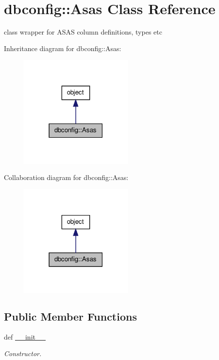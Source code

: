 \hypertarget{classdbconfig_1_1Asas}{
\section{dbconfig::Asas Class Reference}
\label{classdbconfig_1_1Asas}
}


class wrapper for ASAS column definitions, types etc  




Inheritance diagram for dbconfig::Asas:\nopagebreak
\begin{figure}[H]
\begin{center}
\leavevmode
\includegraphics[width=162pt]{classdbconfig_1_1Asas__inherit__graph}
\end{center}
\end{figure}


Collaboration diagram for dbconfig::Asas:\nopagebreak
\begin{figure}[H]
\begin{center}
\leavevmode
\includegraphics[width=162pt]{classdbconfig_1_1Asas__coll__graph}
\end{center}
\end{figure}
\subsection*{Public Member Functions}
\begin{DoxyCompactItemize}
\item 
def \hyperlink{classdbconfig_1_1Asas_a9c2ce09253fdd84b02778f86ac71e82f}{\_\-\_\-init\_\-\_\-}
\begin{DoxyCompactList}\small\item\em Constructor. \item\end{DoxyCompactList}\end{DoxyCompactItemize}
